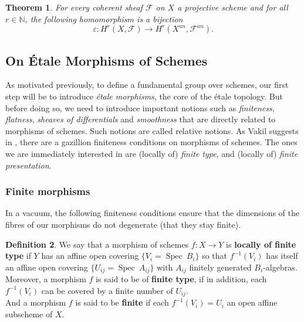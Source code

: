 \documentclass{article}
\theoremstyle{plain}
\newtheorem{theorem}{Theorem}[subsection]
\theoremstyle{definition}
\newtheorem{definition}[theorem]{Definition}
\DeclareMathOperator{\Spec}{Spec}
\begin{document}
\begin{theorem}
    For every coherent sheaf $\mathcal{F}$ on $X$ a projective scheme and for all $r \in \mathbb{N}$, the following  homomorphism is a bijection
    $$\varepsilon : H^r(X,\mathcal{F}) \rightarrow H^r(X^{an},\mathcal{F}^{an}).$$
\end{theorem}







\subsection{On \'Etale Morphisms of Schemes}
\label{morphisms_of_schemes}

As motivated previously, to define a fundamental group over schemes, our first step will be to introduce \textit{\'etale morphisms}, the core of the \'etale topology.
But before doing so, we need to introduce important notions such as \textit{finiteness}, \textit{flatness}, \textit{sheaves of differentials} and \textit{smoothness} that are directly related to morphisms of schemes. 
Such notions are called relative notions.
\noindent As Vakil suggests in \cite{Vakil}, there are a gazillion finiteness conditions on morphisms of schemes. 
The ones we are immediately interested in are (locally of) \textit{finite type}, and (locally of) \textit {finite presentation}. 


 


\subsubsection{Finite morphisms}

In a vacuum, the following finiteness conditions ensure that the dimensions of the fibres of our morphisms do not degenerate (that they stay finite).

\begin{definition}
    We say that a morphism of schemes $f:X\rightarrow Y$ is \textbf{locally of finite type} if $Y$ has an affine open covering $\{V_i = \Spec\:B_i\}$ so that $f^{-1}(V_i)$ has itself an affine open covering $\{U_{ij} = \Spec\:A_{ij}\}$ with $A_{ij}$ finitely generated $B_i$-algebras.\\
    Moreover, a morphism $f$ is said to be of \textbf{finite type}, if in addition, each $f^{-1}(V_i)$ can be covered by a finite number of $U_{ij}$.\\
    And a morphism $f$ is said to be \textbf{finite} if each $f^{-1}(V_i)=U_i$ an open affine subscheme of $X$.
\end{definition}
\end{document}
